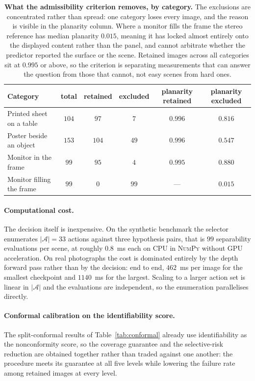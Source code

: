 \begin{table}[!ht]
\caption{\textbf{What the admissibility criterion removes, by category.} The
exclusions are concentrated rather than spread: one category loses every image, and
the reason is visible in the planarity column. Where a monitor fills the frame the
stereo reference has median planarity $0.015$, meaning it has locked almost
entirely onto the displayed content rather than the panel, and cannot arbitrate
whether the predictor reported the surface or the scene. Retained images across all
categories sit at $0.995$ or above, so the criterion is separating measurements
that can answer the question from those that cannot, not easy scenes from hard
ones.}
\label{tab:supp-category-exclusion}
\begin{center}
\footnotesize
\begin{tabular}{lccccc}
\toprule
\textbf{Category} & \textbf{total} & \textbf{retained} & \textbf{excluded} &
\textbf{planarity retained} & \textbf{planarity excluded} \\
\midrule
Printed sheet on a table  & $104$ & $97$  & $7$   & $0.996$ & $0.816$ \\
Poster beside an object   & $153$ & $104$ & $49$  & $0.996$ & $0.547$ \\
Monitor in the frame      & $99$  & $95$  & $4$   & $0.995$ & $0.880$ \\
Monitor filling the frame & $99$  & $0$   & $99$  & --- & $\mathbf{0.015}$ \\
\bottomrule
\end{tabular}
\end{center}
\end{table}

\paragraph{Computational cost.}
The decision itself is inexpensive. On the synthetic benchmark the selector
enumerates $|\mathcal{A}| = 33$ actions against three hypothesis pairs, that is
$99$ separability evaluations per scene, at roughly $0.8$~ms each on CPU in
\textsc{NumPy} without GPU acceleration. On real photographs the cost is dominated
entirely by the depth forward pass rather than by the decision: end to end, $462$~ms
per image for the smallest checkpoint and $1140$~ms for the largest. Scaling to a
larger action set is linear in $|\mathcal{A}|$ and the evaluations are independent,
so the enumeration parallelises directly.

\paragraph{Conformal calibration on the identifiability score.}
The split-conformal results of Table~\ref{tab:conformal} already use
identifiability as the nonconformity score, so the coverage guarantee and the
selective-risk reduction are obtained together rather than traded against one
another: the procedure meets its guarantee at all five levels while lowering the
failure rate among retained images at every level.

